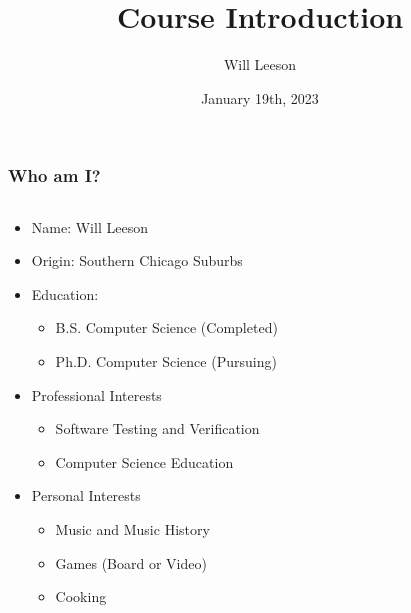 \documentclass{beamer}
\title[Introduction]{Course Introduction}
\author{Will Leeson}
\date{January 19th, 2023}
\begin{document}
\begin{frame}
    \titlepage
\end{frame}

\begin{frame}
    \frametitle{Who am I?}
    \begin{columns}
        \begin{column}{0.65\linewidth}
            \begin{itemize}[<+->]
                \item Name: Will Leeson
                \item Origin: Southern Chicago Suburbs
                \item Education:
                \begin{itemize}
                    \item B.S. Computer Science (Completed)
                    \item Ph.D. Computer Science (Pursuing)
                \end{itemize} 
                \item Professional Interests
                \begin{itemize}
                    \item Software Testing and Verification
                    \item Computer Science Education
                \end{itemize}
                \item Personal Interests
                \begin{itemize}
                    \item Music and Music History
                    \item Games (Board or Video)
                    \item Cooking
                \end{itemize}
            \end{itemize}
        \end{column}
        \begin{column}{0.25\linewidth}
            \centering

\end{column}
\end{columns}
\end{frame}
\end{document}

